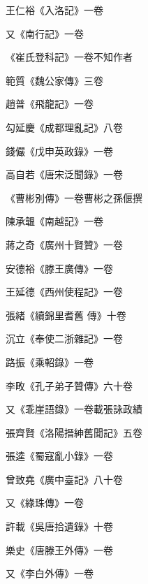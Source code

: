 \begin{pinyinscope}
 王仁裕《入洛記》一卷



 又《南行記》一卷



 《崔氏登科記》一卷不知作者



 範質《魏公家傳》三卷



 趙普《飛龍記》一卷



 勾延慶《成都理亂記》八卷



 錢儼《戊申英政錄》一卷



 高自若《唐宋泛聞錄》一卷



 《曹彬別傳》一卷曹彬之孫偃撰



 陳承韞《南越記》一卷



 蔣之奇《廣州十賢贊》一卷



 安德裕《滕王廣傳》一卷



 王延德《西州使程記》一卷



 張緒《續錦里耆舊
 傳》十卷



 沉立《奉使二浙雜記》一卷



 路振《乘軺錄》一卷



 李畋《孔子弟子贊傳》六十卷



 又《乖崖語錄》一卷載張詠政績



 張齊賢《洛陽搢紳舊聞記》五卷



 張逵《蜀寇亂小錄》一卷



 曾致堯《廣中臺記》八十卷



 又《綠珠傳》一卷



 許載《吳唐拾遺錄》十卷



 樂史《唐滕王外傳》一卷



 又《李白外傳》一卷




\end{pinyinscope}
